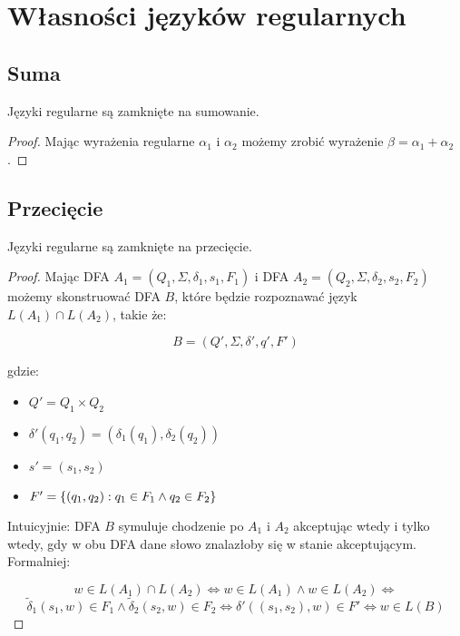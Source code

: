 \section{Własności języków regularnych}

\subsection{Suma}

\begin{theorem}
Języki regularne są zamknięte na sumowanie.
\end{theorem}
\begin{proof}
 Mając wyrażenia regularne \(\alpha_1\) i \(\alpha_2\) możemy zrobić wyrażenie \(\beta = \alpha_1 + \alpha_2\).
\end{proof}

\subsection{Przecięcie}
\begin{theorem}
Języki regularne są zamknięte na przecięcie.
\end{theorem}
\begin{proof}
 Mając DFA \(A_1 = (Q_1, \Sigma, \delta_1, s_1, F_1)\) i DFA \(A_2 = (Q_2, \Sigma, \delta_2, s_2, F_2)\) możemy skonstruować DFA \(B\), które będzie rozpoznawać język \(L(A_1) \cap L(A_2)\), takie że:
 
 \[
    B = (Q', \Sigma, \delta', q', F')
 \]
 
 gdzie: 
 
 \begin{itemize}
     \item \( Q' = Q_1 \times Q_2 \)
     \item \( \delta'(q_1, q_2) = (\delta_1(q_1), \delta_2(q_2)) \)
     \item \( s' = (s_1, s_2) \)
     \item \( F' = \set{(q_1, q_2) : q_1 \in F_1 \land q_2 \in F_2} \)
     
 \end{itemize}
 
 Intuicyjnie: DFA \(B\) symuluje chodzenie po \(A_1\) i \(A_2\) akceptując wtedy i tylko wtedy, gdy w obu DFA dane słowo znalazłoby się w stanie akceptującym. Formalniej:
 
 \[ 
    w \in L(A_1) \cap L(A_2) \iff w \in L(A_1) \land w \in L(A_2) \iff  
 \]
 \[ 
    \tilde \delta_1(s_1, w) \in F_1 \land \tilde \delta_2(s_2, w) \in F_2 \iff \delta'((s_1, s_2), w) \in F' \iff w \in L(B) 
 \]
 
\end{proof}

